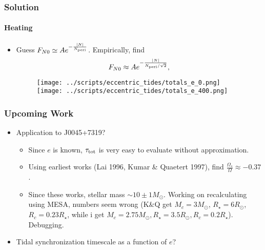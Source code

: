 \documentclass[dvipsnames,8pt]{beamer}
\DeclarePairedDelimiter\abs{\lvert}{\rvert}
\begin{document}
\begin{frame}
    \frametitle{Solution}
    \framesubtitle{Heating}

    \begin{itemize}
        \item Guess $F_{N0} \simeq Ae^{-\frac{\abs{N}}{N_{\rm peri}}}$.
            Empirically, find
            \begin{equation}
                F_{N0} \approx Ae^{-\frac{\abs{N}}{N_{\rm peri}/\sqrt{2}}},
            \end{equation}

        \begin{figure}[t]
            \centering
            \texttt{[image: ../scripts/eccentric\_tides/totals\_e\_0.png]}
            \texttt{[image: ../scripts/eccentric\_tides/totals\_e\_400.png]}
        \end{figure}
    \end{itemize}
\end{frame}

\begin{frame}
    \frametitle{Upcoming Work}

    \begin{itemize}
        \item Application to J0045+7319?
        \begin{itemize}
            \item Since $e$ is known, $\tau_{\rm tot}$ is very easy to evaluate
                without approximation.

            \item Using earliest works (Lai 1996, Kumar \& Quaetert 1997), find
                $\frac{\Omega_s}{\Omega} \approx -0.37$.

            \item Since these works, stellar mass $\sim 10 \pm 1 M_{\odot}$.
                Working on recalculating using MESA, numbers seem wrong (K\&Q
                get $M_{c} = 3M_{\odot}$, $R_{\star} = 6R_{\odot}$, $R_c =
                0.23R_{\star}$, while i get $M_c = 2.75M_{\odot}, R_\star =
                3.5R_{\odot}, R_c = 0.2R_{\star}$). Debugging.
        \end{itemize}

        \item Tidal synchronization timescale as a function of $e$?
    \end{itemize}
\end{frame}
\end{document}
